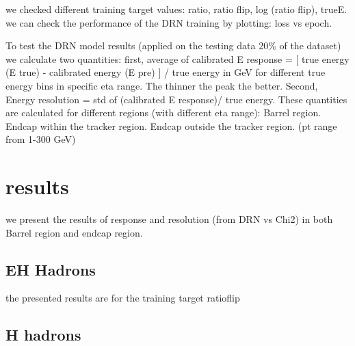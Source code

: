 we checked different training target values: ratio, ratio flip, log (ratio flip), trueE.  
we can check the performance of the DRN training by plotting: loss vs epoch.

To test the DRN model results (applied on the testing data 20\% of the dataset) we calculate two quantities: first, average of calibrated E response = [ true energy (E true) - calibrated energy (E pre) ] / true energy in GeV for different true energy bins in specific eta range. The thinner the peak the better. 
Second, Energy resolution = std of (calibrated E response)/ true energy. These quantities are calculated for different regions (with different eta range): Barrel region. Endcap within the tracker region. Endcap outside the tracker region. (pt range from 1-300 GeV)  


\section{results}
we present the results of response and resolution (from DRN vs Chi2) in  both Barrel region and endcap region.

\subsection{EH Hadrons}
the presented results are for the training target ratioflip





\subsection{H hadrons}




